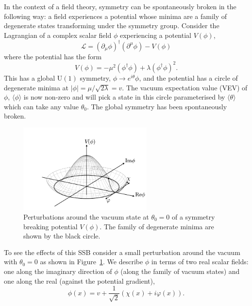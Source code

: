 In the context of a field theory, symmetry can be spontaneously broken in the following way: a field experiences a potential whose minima are a family of degenerate states transforming under the symmetry group. 
Consider the Lagrangian of a complex scalar field $\phi$ experiencing a potential $V(\phi)$,
\begin{equation}
    \label{eq:theory:global_SSB_L}
    \mathcal{L} = (\partial_{\mu}\phi)^{\dag}(\partial^{\mu}\phi) - V(\phi)
\end{equation}
where the potential has the form
\begin{equation}
    \label{eq:theory:global_u1_potential}
    V(\phi) = -\mu^{2}(\phi^{\dag}\phi) + \lambda(\phi^{\dag}\phi)^{2}.
\end{equation}
This has a global $\mathrm{U}(1)$ symmetry, $\phi\rightarrow{e^{i\theta}}\phi$, and the potential has a circle of degenerate minima at $|\phi| = {\mu}/{\sqrt{2\lambda}} = v$. 
The vacuum expectation value (VEV) of $\phi$, $\langle\phi\rangle$ is now non-zero and will pick a state in this circle parameterised by $\langle\theta\rangle$ which can take any value $\theta_{0}$. The global symmetry has been spontaneously broken.
\begin{figure}[h!]
    \centering
    \includegraphics[width=0.6\textwidth]{figures/theory/ssb_potential.pdf}
    \caption{Perturbations around the vacuum state at $\theta_0=0$ of a symmetry breaking potential $V(\phi)$. The family of degenerate minima are shown by the black circle.}
    \label{fig:theory:global_ssb_potential}
\end{figure}
To see the effects of this SSB consider a small perturbation around the vacuum with $\theta_{0}=0$ as shown in Figure~\ref{fig:theory:global_ssb_potential}. 
We describe $\phi$ in terms of two real scalar fields: one along the imaginary direction of $\phi$ (along the family of vacuum states) and one along the real (against the potential gradient),
\begin{equation}
    \phi(x) = v + \frac{1}{\sqrt{2}}(\chi(x) + i\varphi(x)).
\end{equation}
